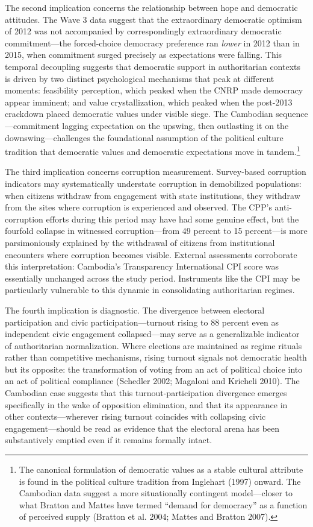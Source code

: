 \documentclass[
  12pt,
  letterpaper]{article}
\begin{document}
The second implication concerns the relationship between hope and
democratic attitudes. The Wave 3 data suggest that the extraordinary
democratic optimism of 2012 was not accompanied by correspondingly
extraordinary democratic commitment---the forced-choice democracy
preference ran \emph{lower} in 2012 than in 2015, when commitment surged
precisely as expectations were falling. This temporal decoupling
suggests that democratic support in authoritarian contexts is driven by
two distinct psychological mechanisms that peak at different moments:
feasibility perception, which peaked when the CNRP made democracy appear
imminent; and value crystallization, which peaked when the post-2013
crackdown placed democratic values under visible siege. The Cambodian
sequence---commitment lagging expectation on the upswing, then
outlasting it on the downswing---challenges the foundational assumption
of the political culture tradition that democratic values and democratic
expectations move in tandem.\footnote{The canonical formulation of
  democratic values as a stable cultural attribute is found in the
  political culture tradition from Inglehart (1997) onward. The
  Cambodian data suggest a more situationally contingent model---closer
  to what Bratton and Mattes have termed ``demand for democracy'' as a
  function of perceived supply (Bratton et al. 2004; Mattes and Bratton
  2007).}

The third implication concerns corruption measurement. Survey-based
corruption indicators may systematically understate corruption in
demobilized populations: when citizens withdraw from engagement with
state institutions, they withdraw from the sites where corruption is
experienced and observed. The CPP's anti-corruption efforts during this
period may have had some genuine effect, but the fourfold collapse in
witnessed corruption---from 49 percent to 15 percent---is more
parsimoniously explained by the withdrawal of citizens from
institutional encounters where corruption becomes visible. External
assessments corroborate this interpretation: Cambodia's Transparency
International CPI score was essentially unchanged across the study
period. Instruments like the CPI may be particularly vulnerable to this
dynamic in consolidating authoritarian regimes.

The fourth implication is diagnostic. The divergence between electoral
participation and civic participation---turnout rising to 88 percent
even as independent civic engagement collapsed---may serve as a
generalizable indicator of authoritarian normalization. Where elections
are maintained as regime rituals rather than competitive mechanisms,
rising turnout signals not democratic health but its opposite: the
transformation of voting from an act of political choice into an act of
political compliance (Schedler 2002; Magaloni and Kricheli 2010). The
Cambodian case suggests that this turnout-participation divergence
emerges specifically in the wake of opposition elimination, and that its
appearance in other contexts---wherever rising turnout coincides with
collapsing civic engagement---should be read as evidence that the
electoral arena has been substantively emptied even if it remains
formally intact.
\end{document}
